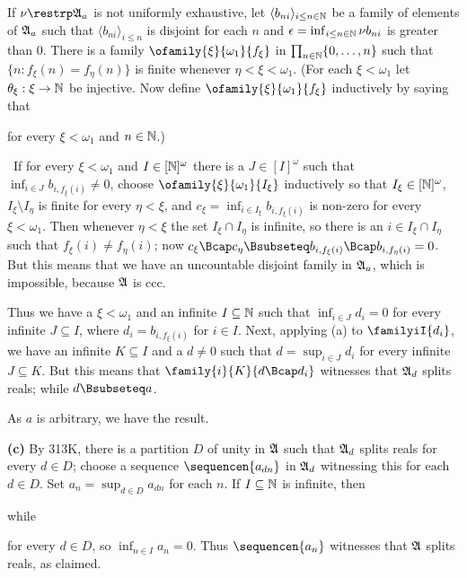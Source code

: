 {\medskip

 If $\nu\restrp\frak A_a$ is not uniformly exhaustive,
let $\langle b_{ni}\rangle_{i\le n\in\Bbb N}$ be a family of elements
of $\frak A_a$ such that $\langle b_{ni}\rangle_{i\le n}$ is disjoint
for each $n$ and
$\epsilon=\inf_{i\le n\in\Bbb N}\nu b_{ni}$ is greater than $0$.   There is
a family $\ofamily{\xi}{\omega_1}{f_{\xi}}$ in
$\prod_{n\in\Bbb N}\{0,\ldots,n\}$ such that
$\{n:f_{\xi}(n)=f_{\eta}(n)\}$ is finite whenever
$\eta<\xi<\omega_1$.   (For each $\xi<\omega_1$ let
$\theta_{\xi}:\xi\to\Bbb N$ be injective.   Now define
$\ofamily{\xi}{\omega_1}{f_{\xi}}$ inductively by saying that


\noindent for every $\xi<\omega_1$ and $n\in\Bbb N$.)

\Quer\ If for every
$\xi<\omega_1$ and $I\in[\Bbb N]^{\omega}$ there is a
$J\in[I]^{\omega}$ such that
$\inf_{i\in J}b_{i,f_{\xi}(i)}\ne 0$, choose
$\ofamily{\xi}{\omega_1}{I_{\xi}}$ inductively so that
$I_{\xi}\in[\Bbb N]^{\omega}$, $I_{\xi}\setminus I_{\eta}$ is finite
for every $\eta<\xi$, and
$c_{\xi}=\inf_{i\in I_{\xi}}b_{i,f_{\xi}(i)}$ is non-zero for every
$\xi<\omega_1$.   Then
whenever $\eta<\xi$ the set $I_{\xi}\cap I_{\eta}$ is infinite, so
there is an
$i\in I_{\xi}\cap I_{\eta}$ such that $f_{\xi}(i)\ne f_{\eta}(i)$;
now $c_{\xi}\Bcap c_{\eta}
\Bsubseteq b_{i,f_{\xi}(i)}\Bcap b_{i,f_{\eta}(i)}=0$.
But this means that we have an uncountable
disjoint family in $\frak A_a$, which is impossible, because
$\frak A$ is ccc.\ \Bang

Thus we have a $\xi<\omega_1$ and an infinite $I\subseteq\Bbb N$ such
that $\inf_{i\in J}d_i=0$ for every infinite $J\subseteq I$, where
$d_i=b_{i,f_{\xi}(i)}$ for $i\in I$.   Next, applying (a) to
$\familyiI{d_i}$, we have an infinite $K\subseteq I$ and a $d\ne 0$
such that $d=\sup_{i\in J}d_i$ for every infinite $J\subseteq K$.
But this means that
$\family{i}{K}{d\Bcap d_i}$ witnesses that $\frak A_d$ splits reals;
while $d\Bsubseteq a$.

As $a$ is arbitrary, we have the result.\ \Qed

\medskip

{\bf (c)} By 313K, there is a partition $D$ of unity in $\frak A$
such that
$\frak A_d$ splits reals for every $d\in D$;  choose a sequence
$\sequencen{a_{dn}}$ in $\frak A_d$ witnessing this for each $d\in D$.
Set $a_n=\sup_{d\in D}a_{dn}$ for each $n$.   If $I\subseteq\Bbb N$ is
infinite, then


\noindent while


\noindent for every $d\in D$, so $\inf_{n\in I}a_n=0$.   Thus
$\sequencen{a_n}$ witnesses that $\frak A$ splits reals, as claimed.
}%

